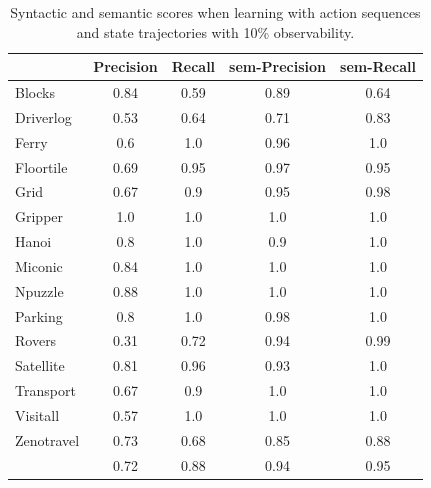 \begin{table}[hbt!]
     \begin{footnotesize}
	 \begin{center}		
		\begin{tabular}{l|c|c|c|c|}		
			& {\bf Precision} & {\bf Recall} & {\bf sem-Precision} & {\bf sem-Recall} \\
			\hline
			Blocks & 0.84 & 0.59 & 0.89 & 0.64 \\
			Driverlog & 0.53 & 0.64 & 0.71 & 0.83 \\
			Ferry & 0.6 & 1.0 & 0.96 & 1.0 \\
			Floortile & 0.69 & 0.95 & 0.97 & 0.95 \\
			Grid & 0.67 & 0.9 & 0.95 & 0.98 \\
			Gripper & 1.0 & 1.0 & 1.0 & 1.0 \\
			Hanoi & 0.8 & 1.0 & 0.9 & 1.0 \\
			Miconic & 0.84 & 1.0 & 1.0 & 1.0 \\
			Npuzzle & 0.88 & 1.0 & 1.0 & 1.0 \\
			Parking & 0.8 & 1.0 & 0.98 & 1.0 \\
			Rovers & 0.31 & 0.72 & 0.94 & 0.99 \\
			Satellite & 0.81 & 0.96 & 0.93 & 1.0 \\
			Transport & 0.67 & 0.9 & 1.0 & 1.0 \\
			Visitall & 0.57 & 1.0 & 1.0 & 1.0 \\
			Zenotravel & 0.73 & 0.68 & 0.85 & 0.88 \\
			\hline
			& 0.72 & 0.88 & 0.94 & 0.95
		\end{tabular}
	 \end{center}
     \end{footnotesize}
     \caption{\small Syntactic and semantic scores when learning with \FO action sequences and \PO state trajectories with 10\% observability.}
     \label{tab:metric_comparison_100_10}
\end{table}


